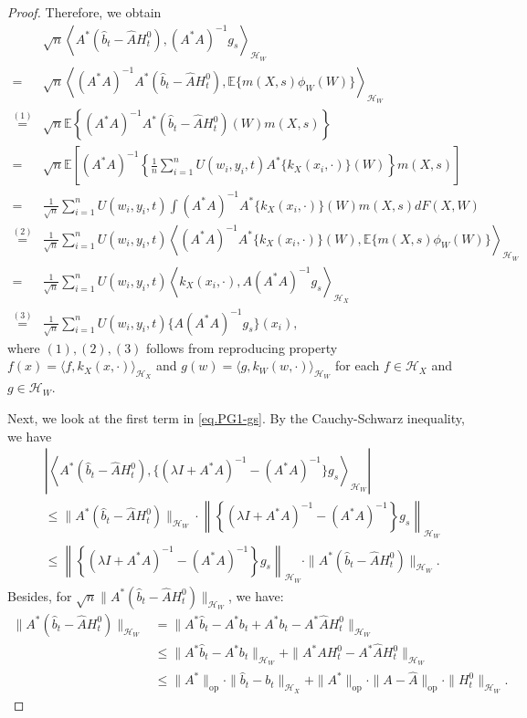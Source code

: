 \documentclass[
  12pt]{article}
\def\cH{\mathcal{H}}
\begin{document}
\begin{proof}
Therefore, we obtain
\begin{align*}
	&\sqrt{n}\left\langle A^*(\widehat{b}_t-\widehat{A}H^0_t),(A^*A)^{-1}g_s \right\rangle_{\mathcal{H}_W} \\
    = &\sqrt{n} \left\langle (A^*A)^{-1}A^*(\widehat{b}_t-\widehat{A}H^0_t),\mathbb{E} \{ m(X,s)\phi_W(W)\} \right\rangle_{\mathcal{H}_W} \\
	\overset{(1)}{=} &\sqrt{n}\mathbb{E} \left\{(A^*A)^{-1}A^*(\widehat{b}_t-\widehat{A}H^0_t)(W)m(X,s) \right\}\\
	=&\sqrt{n}\mathbb{E} \left[ (A^*A)^{-1}\left\{ \frac{1}{n}\sum_{i=1}^n{U(w_i,y_i,t) A^*\{ k_X( x_i,\cdot ) \}(W)} \right\} m(X,s) \right]\\
	=&\frac{1}{\sqrt{n}}\sum_{i=1}^n{U(w_i,y_i,t) \int{(A^*A)^{-1}A^*\{ k_X( x_i,\cdot )\}(W) m(X,s) dF(X,W)}}\\
	\overset{(2)}{=}&\frac{1}{\sqrt{n}}\sum_{i=1}^n{U(w_i,y_i,t) \left\langle (A^*A)^{-1}A^*\{ k_X( x_i,\cdot )\}(W) ,\mathbb{E} \{ m(X,s)\phi_W(W)\} \right\rangle_{\mathcal{H}_W}}\\
	=&\frac{1}{\sqrt{n}}\sum_{i=1}^n{U(w_i,y_i,t) \left\langle k_X( x_i,\cdot) ,A(A^*A)^{-1}g_s \right\rangle_{\mathcal{H}_X}}\\
	\overset{(3)}{=}&\frac{1}{\sqrt{n}}\sum_{i=1}^n{U(w_i,y_i,t) \{A(A^*A)^{-1}g_s\}(x_i)},
\end{align*}
where $(1),(2),(3)$ follows from reproducing property $f(x)=\langle f, k_X(x,\cdot)\rangle_{\cH_X}$ and $g(w) = \langle g,k_W(w,\cdot)\rangle_{\mathcal{H}_{W}}$ for each $f\in \mathcal{H}_X$ and $g \in \cH_W$. 

Next, we look at the first term in \eqref{eq.PG1-gs}. By the Cauchy-Schwarz inequality, we have
    \begin{align}
	&\left| \left\langle A^*(\widehat{b}_t-\widehat{A}H^0_t),\{ (\lambda I+A^*A)^{-1}-(A^*A)^{-1} \} g_s \right\rangle_{\mathcal{H}_W} \right|\nonumber\\
        & \le \| A^*(\widehat{b}_t-\widehat{A}H^0_t)\|_{\mathcal{H}_W} \cdot\left\| \left\{ (\lambda I+A^*A)^{-1}-(A^*A)^{-1} \right\} g_s \right\|_{\mathcal{H}_W} \nonumber\\
	&\le  \left\| \left\{ (\lambda I+A^*A)^{-1}-(A^*A)^{-1} \right\} g_s \right\|_{\mathcal{H}_W} \cdot  \| A^*(\widehat{b}_t-\widehat{A}H^0_t)\|_{\mathcal{H}_W}. \label{eq: G1-front}
\end{align}
Besides, for $\sqrt{n}\| A^*(\widehat{b}_t-\widehat{A}H^0_t)\|_{\mathcal{H}_W}$, we have:
\begin{align*}
	\| A^*(\widehat{b}_t-\widehat{A}H^0_t)\|_{\mathcal{H}_W} &=\| A^*\widehat{b}_t-A^*b_t+A^*b_t-A^*\widehat{A}H^0_t\|_{\mathcal{H}_W}\\
	&\le \| A^*\widehat{b}_t-A^*b_t\|_{\mathcal{H}_W} +\| A^*AH^0_t-A^*\widehat{A}H^0_t\|_{\mathcal{H}_W}\\
	&\le \| A^*\|_{\mathrm{op}} \cdot \| \widehat{b}_t-b_t\|_{\mathcal{H}_X} +\| A^*\|_{\mathrm{op}} \cdot \| A-\widehat{A}\|_{\mathrm{op}} \cdot \| H^0_t\|_{\mathcal{H}_W}.
\end{align*}


\end{proof}
\end{document}
